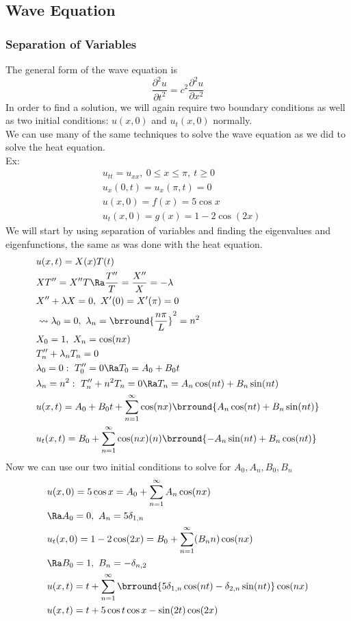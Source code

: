 \subsection{Wave Equation}
\subsubsection{Separation of Variables}
The general form of the wave equation is
$$\frac{\partial^2 u}{\partial t^2}=c^2\frac{\partial^2u}{\partial x^2}$$
In order to find a solution, we will again require two boundary conditions as well as two initial conditions: $u(x,0)$ and $u_t(x,0)$ normally.\\
We can use many of the same techniques to solve the wave equation as we did to solve the heat equation.\\
Ex:
\begin{align*}
    &u_{tt}=u_{xx},\ 0\leq x\leq \pi,\ t\geq 0\\
    &u_x(0,t)=u_x(\pi,t)=0\\
    &u(x,0)=f(x)=5\cos x\\
    &u_t(x,0)=g(x)=1-2\cos(2x)
\end{align*}
We will start by using separation of variables and finding the eigenvalues and eigenfunctions, the same as was done with the heat equation.
\begin{align*}
    &u(x,t)=X(x)T(t)\\
    &XT''=X''T\Ra \frac{T''}{T}=\frac{X''}{X}=-\lambda\\
    &X''+\lambda X=0,\ X'(0)=X'(\pi)=0\\
    &\leadsto \lambda_0=0,\ \lambda_n=\brround{\frac{n\pi}{L}}^2=n^2\\
    &X_0=1,\ X_n=\cos(nx)\\
    &T_n''+\lambda_n T_n=0\\
    &\lambda_0=0:\ T_0''=0\Ra T_0=A_0+B_0t\\
    &\lambda_n=n^2:\ T_n''+n^2T_n=0\Ra T_n=A_n\cos(nt)+B_n\sin(nt)\\
    &u(x,t)=A_0+B_0t+\sum_{n=1}^\infty\cos(nx)\brround{A_n\cos(nt)+B_n\sin(nt)}\\
    &u_t(x,t)=B_0+\sum_{n=1}^\infty\cos(nx)(n)\brround{-A_n\sin(nt)+B_n\cos(nt)}
\end{align*}
Now we can use our two initial conditions to solve for $A_0,A_n,B_0,B_n$
\begin{align*}
    &u(x,0)=5\cos x=A_0+\sum_{n=1}^\infty A_n\cos(nx)\\
    &\Ra A_0=0,\ A_n=5\delta_{1,n}\\
    &u_t(x,0)=1-2\cos(2x)=B_0+\sum_{n=1}^\infty(B_n n)\cos(nx)\\
    &\Ra B_0=1,\ B_n=-\delta_{n,2}\\
    &u(x,t)=t+\sum_{n=1}^\infty\brround{5\delta_{1,n}\cos(nt)-\delta_{2,n}\sin(nt)}\cos(nx)\\
    &u(x,t)=t+5\cos t\cos x-\sin(2t)\cos(2x)
\end{align*}
